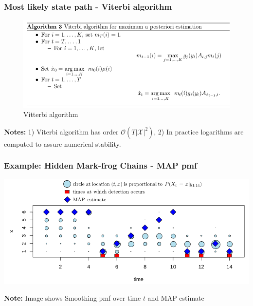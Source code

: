 \documentclass[xcolor=dvipsnames, compress]{beamer}
\begin{document}
\begin{frame}
\frametitle{Most likely state path - Viterbi algorithm}
\begin{figure}
	\includegraphics[scale=0.45]{images/viterbi2.jpg}
	\caption{Vitterbi algorithm}
\end{figure}

\textbf{Notes:} 1) Viterbi algorithm has order $\mathcal{O}(T |\mathcal{X}|^2)$, 2) In practice logarithms are computed to assure numerical stability.

\end{frame}

\begin{frame}
\frametitle{Example: Hidden Mark-frog Chains - MAP pmf}

\includegraphics[width=1.01\textwidth]{images/frog_smooth_map.png}

\textbf{Note:} Image shows Smoothing pmf over time $t$ and MAP estimate
\end{frame}
\end{document}
